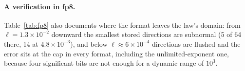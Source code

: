 \paragraph{A verification in fp8.}
Table~\ref{tab:fp8} also documents where the format leaves the law's domain: from
$\ell=1.3\times10^{-2}$ downward the smallest stored directions are subnormal (5 of 64
there, 14 at $4.8\times10^{-3}$), and below $\ell\approx6\times10^{-4}$ directions are
flushed and the error sits at the cap in every format, including the unlimited-exponent
one, because four significant bits are not enough for a dynamic range of $10^{3}$.
